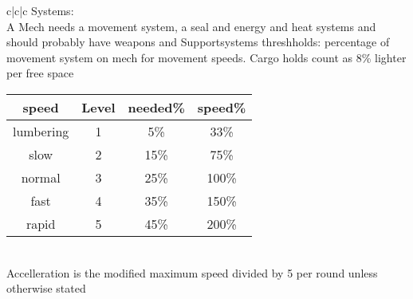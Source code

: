 \documentclass{article}
\begin{document}
\begin{tabular}{c|c|c}
    Systems:\\
    A Mech needs a movement system, a seal and energy and heat systems and should probably have weapons and Supportsystems\newline
    threshholds: percentage of movement system on mech for movement speeds. Cargo holds count as 8\% lighter per
    free space\newline
    \begin{tabular}{c|c|c|c}
        speed       &Level  &needed\%& speed\% \\\hline
        lumbering   &1      &5\%     &33\%\\
        slow        &2      &15\%    &75\%\\
        normal      &3      &25\%    &100\%\\
        fast        &4      &35\%    &150\%\\
        rapid       &5      &45\%    &200\%\\
    \end{tabular}\\
    Accelleration is the modified maximum speed divided by 5 per round unless otherwise stated


\end{tabular}
\end{document}
